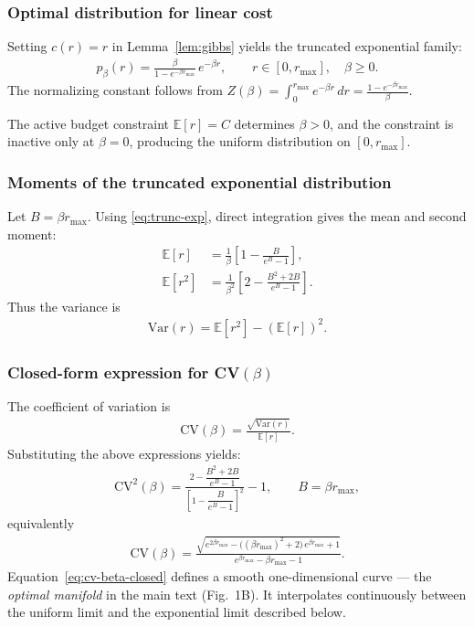 \documentclass[11pt]{article}
\theoremstyle{remark}
\theoremstyle{definition}
\begin{document}
\subsubsection{Optimal distribution for linear cost}

Setting $c(r)=r$ in Lemma~\ref{lem:gibbs} yields the truncated
exponential family:
\begin{align}
p_\beta(r)
= \frac{\beta}{1-e^{-\beta r_{\max}}}\,e^{-\beta r},
\qquad r\in[0,r_{\max}], \quad \beta \ge 0.
\label{eq:trunc-exp}
\end{align}
The normalizing constant follows from
\(
Z(\beta)=\int_0^{r_{\max}} e^{-\beta r}\,dr
       = \frac{1-e^{-\beta r_{\max}}}{\beta}.
\)

The active budget constraint $\mathbb{E}[r]=C$ determines $\beta>0$,
and the constraint is inactive only at $\beta=0$, producing the
uniform distribution on $[0,r_{\max}]$.

\subsubsection{Moments of the truncated exponential distribution}

Let
\(
B = \beta r_{\max}.
\)
Using \eqref{eq:trunc-exp}, direct integration gives the mean and
second moment:
\begin{align}
\mathbb{E}[r]
&= \frac{1}{\beta}
   \left[
     1 - \frac{B}{e^B-1}
   \right],\\
\mathbb{E}[r^2]
&= \frac{1}{\beta^2}
   \left[
     2 - \frac{B^2 + 2B}{e^B - 1}
   \right].
\end{align}
Thus the variance is
\begin{align}
\mathrm{Var}(r)
= \mathbb{E}[r^2] - (\mathbb{E}[r])^2.
\end{align}

\subsubsection{Closed-form expression for CV$(\beta)$}

The coefficient of variation is
\begin{align}
\mathrm{CV}(\beta)
= \frac{ \sqrt{\mathrm{Var}(r)} }{ \mathbb{E}[r] }.
\end{align}
Substituting the above expressions yields:
\begin{align}
\mathrm{CV}^2(\beta)
=
\frac{
2 - \dfrac{B^2 + 2B}{e^B-1}
}{
\left[
1 - \dfrac{B}{e^B - 1}
\right]^2
}
- 1,
\qquad B=\beta r_{\max},
\end{align}
equivalently
\begin{align}
\mathrm{CV}(\beta) = \frac{\sqrt{e^{2\beta r_{\max}} - \bigl((\beta r_{\max})^2 + 2\bigr)\,e^{\beta r_{\max}} + 1}}{e^{\beta r_{\max}} - \beta r_{\max} - 1}.
\label{eq:cv-beta-closed}
\end{align}
Equation~\eqref{eq:cv-beta-closed} defines a smooth one-dimensional
curve --- the \emph{optimal manifold} in the main text (Fig.~1B).  It
interpolates continuously between the uniform limit and the exponential
limit described below.
\end{document}
